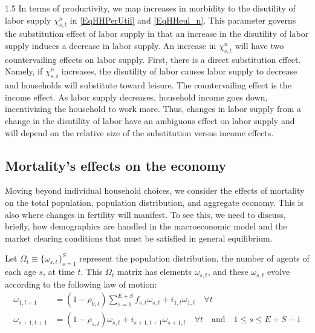 \documentclass[letterpaper,12pt]{article}
\theoremstyle{definition}
\begin{document}
\begin{spacing}{1.5}
    In terms of productivity, we map increases in morbidity to the disutility of labor supply $\chi^n_{s,t}$ in \eqref{EqHHPerUtil} and \eqref{EqHHeul_n}. This parameter governs the substitution effect of labor supply in that an increase in the disutility of labor supply induces a decrease in labor supply. An increase in $\chi^n_{s,t}$ will have two countervailing effects on labor supply. First, there is a direct substitution effect. Namely, if $\chi^n_{s,t}$ increases, the disutility of labor causes labor supply to decrease and households will substitute toward leisure. The countervailing effect is the income effect. As labor supply decreases, household income goes down, incentivizing the household to work more. Thus, changes in labor supply from a change in the disutility of labor have an ambiguous effect on labor supply and will depend on the relative size of the substitution versus income effects.


    \subsection{Mortality's effects on the economy}

    Moving beyond individual household choices, we consider the effects of mortality on the total population, population distribution, and aggregate economy. This is also where changes in fertility will manifest. To see this, we need to discuss, briefly, how demographics are handled in the macroeconomic model and the market clearing conditions that must be satisfied in general equilibrium.

    Let $\Omega_t\equiv\{\omega_{s,t}\}_{s=1}^S$ represent the population distribution, the number of agents of each age $s$, at time $t$. This $\Omega_t$ matrix has elements $\omega_{s,t}$, and these $\omega_{s,t}$ evolve according to the following law of motion:
    \begin{equation}\label{EqPopLawofmotion}
      \begin{split}
        \omega_{1,t+1} &= (1 - \rho_{0,t})\sum_{s=1}^{E+S} f_{s,t}\omega_{s,t} + i_{1,t}\omega_{1,t}\quad\forall t \\
        \omega_{s+1,t+1} &= (1 - \rho_{s,t})\omega_{s,t} + i_{s+1, t+1}\omega_{s+1,t}\quad\forall t\quad\text{and}\quad 1\leq s \leq E+S-1
      \end{split}
    \end{equation}


\end{spacing}
\end{document}
